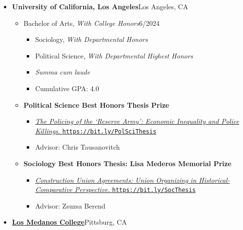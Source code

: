 \begin{itemize}[leftmargin=0em, itemsep=0pt]
\item[] \textbf{University of California, Los Angeles}\hfill{}Los Angeles, CA
\begin{itemize}[leftmargin=2em, itemsep=0pt]
    \item[] Bachelor of Arts, \textit{With College Honors}\hfill{}6/2024
    \begin{itemize}[leftmargin=2em, itemsep=0pt]
        \item[] Sociology, \textit{With Departmental Honors}
        \item[] Political Science, \textit{With Departmental Highest Honors}
    \item[] \textit{Summa cum laude}
    \item[] Cumulative GPA: 4.0
    \end{itemize}
    \vspace{6pt}
\item[] \textbf{Political Science Best Honors Thesis Prize}
\begin{itemize}[leftmargin=2em, itemsep=0pt, rightmargin=5em]
    \item[] \href{https://bit.ly/PolSciThesis}{\textit{The Policing of the `Reserve Army': Economic Inequality and Police Killings.} \texttt{https://bit.ly/PolSciThesis}}
    \item[] Advisor: Chris Tausanovitch
\end{itemize}
\vspace{6pt}
\item[] \textbf{Sociology Best Honors Thesis: Lisa Mederos Memorial Prize}
\begin{itemize}[leftmargin=2em, itemsep=0pt, rightmargin=5em]
    \item[] \href{https://bit.ly/SocThesis}{\textit{Construction Union Agreements: Union Organizing in Historical-Comparative Perspective.} \texttt{https://bit.ly/SocThesis}}
    \item[] Advisor: Zsuzsa Berend
    \end{itemize}
\end{itemize}
\vspace{12pt}
\item[] \textbf{\href{https://www.losmedanos.edu/}{Los Medanos College}}\hfill{}Pittsburg, CA
\begin{itemize}[leftmargin=2em, itemsep=0pt]

\end{itemize}
\end{itemize}
